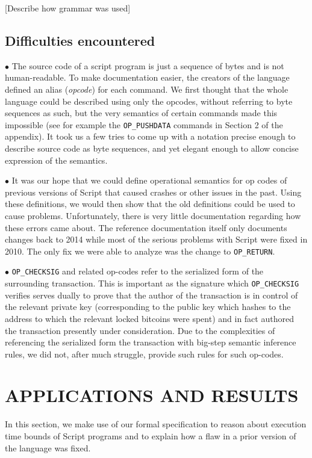 \documentclass[letterpaper, 10 pt, conference]{ieeeconf}
\begin{document}
[Describe how grammar was used]

\subsection{Difficulties encountered}

$\bullet$ The source code of a script program is just a sequence of bytes and is not human-readable. To make documentation easier, the creators of the language defined an alias (\textit{opcode}) for each command. We first thought that the whole language could be described using only the opcodes, without referring to byte sequences as such, but the very semantics of certain commands made this impossible (see for example the \texttt{OP\_PUSHDATA} commands in Section 2 of the appendix). It took us a few tries to come up with a notation precise enough to describe source code as byte sequences, and yet elegant enough to allow concise expression of the semantics.

$\bullet$ It was our hope that we could define operational semantics for op codes of previous versions of Script that caused crashes or other issues in the past.  Using these definitions, we would then show that the old definitions could be used to cause problems.  Unfortunately, there is very little documentation regarding how these errors came about.  The reference documentation itself only documents changes back to 2014 while most of the serious problems with Script were fixed in 2010. The only fix we were able to analyze was the change to \texttt{OP\_RETURN}.

$\bullet$ \texttt{OP\_CHECKSIG} and related op-codes refer to the serialized form of the surrounding transaction. This is important as the signature which \texttt{OP\_CHECKSIG} verifies serves dually to prove that the author of the transaction is in control of the relevant private key (corresponding to the public key which hashes to the address to which the relevant locked bitcoins were spent) and in fact authored the transaction presently under consideration. Due to the complexities of referencing the serialized form the transaction with big-step semantic inference rules, we did not, after much struggle, provide such rules for such op-codes.

\section{APPLICATIONS AND RESULTS}

In this section, we make use of our formal specification to reason about execution time bounds of Script programs and to explain how a flaw in a prior version of the language was fixed.
\end{document}
